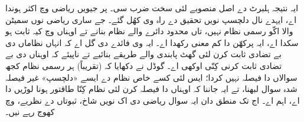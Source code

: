 \documentclass[../../../include/open-logic-section]{subfiles}
\begin{document}
ایہ نتیجہ ہلبرٹ دے
اصل منصوبے لئی
سخت ضرب سی۔ پر
جیویں ریاضی وچ
اکثر ہوندا اے،
ایہدے نال دلچسپ
نویں تحقیق دے
راہ وی کھُل گئے۔
جے ساری ریاضی
نوں سمیٹن والا
اکّو رسمی نظام
نہیں، تاں محدود
دائرے والے نظام
بنانے تے اوہناں
وچ کیہ ثابت ہو
سکدا اے، ایہ
پرکھّن دا کم
معنی رکھدا اے۔
ایہ وی فائدے دی گل اے
کہ انہاں نظاماں دی بے
تضادی ثابت کرن لئی
گھٹ پابندی والے طریقے
بنائیے تے ناپیئے کہ
اوہناں دی بے تضادی
ثابت کرنی کِنّی اوکھی اے۔
گوڈل نے دکھایا
کہ (تقریباً)
ہر رسمی نظام
کجھ سوالاں دا
فیصلہ نہیں
کردا؛ ایس
لئی کسے خاص
نظام دے
ایسے «دلچسپ»
غیر فیصلہ شدہ
سوال لبھنا،
تے ایہ جاننا
کہ اوہناں
دا فیصلہ کرن
لئی نظام
کِنّا طاقتور
ہونا لوڑیں دا
اے، اہم
اے۔ اج تک
منطق دان
ایہ سوال
ریاضی دی
اک نویں شاخ،
ثبوتاں دے
نظریے، وچ
کھوج رہے نیں۔
\end{document}
